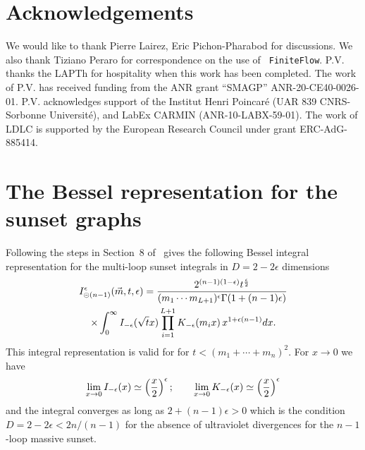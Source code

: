 \documentclass[a4paper,12pt]{article}
\numberwithin{equation}{section}
\numberwithin{figure}{section}
\def\su{\circleddash}
\begin{document}
\section*{Acknowledgements}
We would like to thank Pierre Lairez,  Eric Pichon-Pharabod  for discussions. We also thank Tiziano Peraro for correspondence on the use of {\tt
	FiniteFlow}. P.V. thanks the LAPTh for hospitality when this
      work has been completed.
The work of P.V. has received funding from the ANR grant ``SMAGP''
ANR-20-CE40-0026-01. P.V. acknowledges support of the Institut Henri
Poincar\'e (UAR 839 CNRS-Sorbonne Universit\'e), and LabEx CARMIN
(ANR-10-LABX-59-01). The work of LDLC is  supported by 
the European Research Council under grant ERC-AdG-885414. 


\appendix\section{The Bessel representation for the sunset graphs}\label{sec:bessel}


Following the steps in Section~8 of~\cite{Vanhove:2014wqa}
gives the following Bessel integral representation for the multi-loop
sunset integrals in  $D=2-2\epsilon$ dimensions
\begin{multline}
  I_{\su(n-1)}^\epsilon(\vec m,t,\epsilon)=
  {2^{(n-1) (1-\epsilon)} t^{\epsilon\over2} \over    (m_1\cdots m_{L+1})^{\epsilon}
  \Gamma(1+(n-1)\epsilon)}\cr\times\int_0^\infty I_{-\epsilon}(\sqrt{t} x)
  \prod_{i=1}^{L+1}K_{-\epsilon}(m_ix)\,  x^{1+\epsilon(n-1)}dx.
\end{multline}
This integral representation is valid for   for $t<(m_1+\cdots +m_{n})^2$.
%
For $x\to0$ we have
\begin{equation}
  \lim_{x\to0} I_{-\epsilon}(x)\simeq \left(x\over2\right)^{\epsilon};    \qquad
  \lim_{x\to0} K_{-\epsilon}(x)   \simeq \left(x\over2\right)^{\epsilon}
\end{equation}
and the integral converges as long as $2+(n-1)\epsilon>0$ which is the
condition $D=2-2\epsilon< 2n/(n-1)$ for the absence of ultraviolet divergences
for the $n-1$-loop massive sunset.
\end{document}
